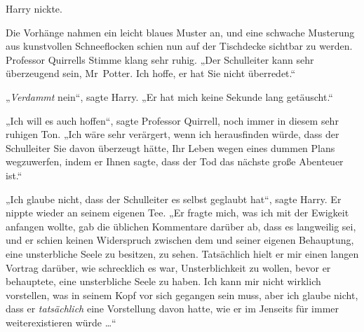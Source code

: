 Harry nickte.

Die Vorhänge nahmen ein leicht blaues Muster an, und eine schwache Musterung aus kunstvollen Schneeflocken schien nun auf der Tischdecke sichtbar zu werden. Professor Quirrells Stimme klang sehr ruhig.
„Der Schulleiter kann sehr überzeugend sein, Mr~Potter. Ich hoffe, er hat Sie nicht überredet.“

„\emph{Verdammt} nein“, sagte Harry.
„Er hat mich keine Sekunde lang getäuscht.“

„Ich will es auch hoffen“, sagte Professor Quirrell, noch immer in diesem sehr ruhigen Ton.
„Ich wäre sehr verärgert, wenn ich herausfinden würde, dass der Schulleiter Sie davon überzeugt hätte, Ihr Leben wegen eines dummen Plans wegzuwerfen, indem er Ihnen sagte, dass der Tod das nächste große Abenteuer ist.“

„Ich glaube nicht, dass der Schulleiter es selbst geglaubt hat“, sagte Harry. Er nippte wieder an seinem eigenen Tee.
„Er fragte mich, was ich mit der Ewigkeit anfangen wollte, gab die üblichen Kommentare darüber ab, dass es langweilig sei, und er schien keinen Widerspruch zwischen dem und seiner eigenen Behauptung, eine unsterbliche Seele zu besitzen, zu sehen. Tatsächlich hielt er mir einen langen Vortrag darüber, wie schrecklich es war, Unsterblichkeit zu wollen, bevor er behauptete, eine unsterbliche Seele zu haben. Ich kann mir nicht wirklich vorstellen, was in seinem Kopf vor sich gegangen sein muss, aber ich glaube nicht, dass er \emph{tatsächlich} eine Vorstellung davon hatte, wie er im Jenseits für immer weiterexistieren würde …“

